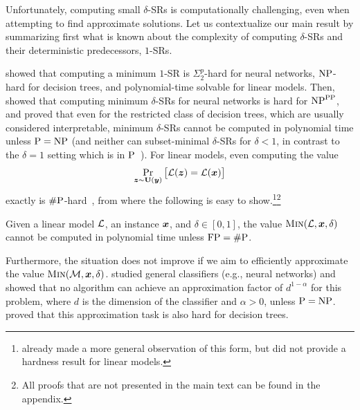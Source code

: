

Unfortunately, computing small $\delta$-SRs is computationally challenging, even when attempting to find approximate solutions. Let us contextualize our main result by summarizing first what is known about the complexity of computing $\delta$-SRs and their deterministic predecessors, $1$-SRs.  

\citet{NEURIPS2020_b1adda14} showed that computing a minimum $1$-SR is $\Sigma_2^p$-hard for neural networks, $\mathrm{NP}$-hard for decision trees, and polynomial-time solvable for linear models. Then, \citet[Theorem 2.4]{Waldchen_MacDonald_Hauch_Kutyniok_2021} showed that computing minimum $\delta$-SRs for neural networks is hard for $\mathrm{NP}^{\mathrm{PP}}$, and \citet{NEURIPS2022_b8963f6a} proved that even for the restricted class of decision trees, which are usually considered interpretable, minimum $\delta$-SRs cannot be computed in polynomial time unless $\mathrm{P} = \mathrm{NP}$ (and neither can subset-minimal $\delta$-SRs for $\delta < 1$, in contrast to the $\delta = 1$ setting which is in $\mathrm{P}$~\citep{izzaExplainingDecisionTrees2020,roaModelInterpretabilityLens2020}). 
For linear models, even computing the value
\[
    \Pr_{{\bm{z}} \sim \mathbf{U}({\bm{y}})}\big[\mathcal{L}({\bm{z}}) = \mathcal{L}({\bm{x}})\big]
\]
exactly is $\mathrm{\#P}$-hard~\citep{NEURIPS2020_b1adda14}, from where the following is easy to show.\footnote{\citet{izzaComputingProbabilisticAbductive2023} already made a more general observation of this form, but did not provide a hardness result for linear models.}\footnote{All proofs that are not presented in the main text can be found in the appendix.}
 
\begin{proposition}\label{prop:hardness}
    Given a linear model $\mathcal{L}$, an instance
    ${\bm{x}}$, and $\delta \in [0,1]$, the value $\operatorname{\textnormal{\textsc{Min}}}(\mathcal{L}, {\bm{x}}, \delta)$
    cannot be computed in polynomial time unless $\mathrm{FP} = \mathrm{\#P}$.
\end{proposition}

Furthermore, the situation does not improve if we aim to efficiently approximate the value $\operatorname{\textnormal{\textsc{Min}}}(\mathcal{M}, {\bm{x}}, \delta)$. \citet[Theorem 2.5]{Waldchen_MacDonald_Hauch_Kutyniok_2021} studied general classifiers (e.g., neural networks) and showed that no algorithm can achieve an approximation factor of $d^{1-\alpha}$ for this problem, where $d$ is the dimension of the classifier and $\alpha > 0$, unless $\mathrm{P} = \mathrm{NP}$. \citet{Kozachinskiy_2023} proved that this approximation task is also hard for decision trees.


